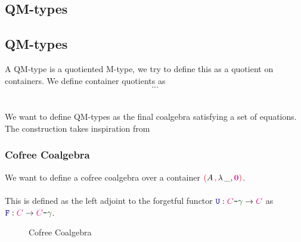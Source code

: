 \documentclass[twoside,11pt,openright]{report}
\theoremstyle{plain} %
\theoremstyle{definition}
\theoremstyle{remark}
\newcommand*{\term}[1]{\textcolor{green!30!black}{#1}} %
\newcommand*{\type}[1]{\textcolor{magenta!90!black}{#1}}
\newcommand*{\containerpair}[2]{\textcolor{red}{(}#1\,\textcolor{red}{,}\,#2\textcolor{red}{)}}
\newcommand*{\universe}[1]{\textcolor{orange!80!black}{#1}}
\newcommand*{\unit}{\type{\textbf{1}}}
\newcommand*{\empt}{\type{\textbf{0}}}
\newcommand*{\coalg}[2]{#1\texttt{-}#2}
\newcommand*{\function}[1]{\textcolor{blue!60!black}{\ensuremath{\mathtt{#1}}}}
\newcommand*{\functor}[1]{\ensuremath{\mathbf{\mathtt{#1}}}}
\begin{document}

\subsection{QM-types}


\subsection{QM-types}
A QM-type is a quotiented M-type, we try to define this as a quotient on containers. We define container quotients as
\begin{equation}
  ...
\end{equation}
\\ \\
We want to define QM-types as the final coalgebra satisfying a set of equations. The construction takes inspiration from \cite{Infinitary-QIITs}
\subsubsection{Cofree Coalgebra}
We want to define a cofree coalgebra over a container \(\containerpair{A}{\lambda\,\_, \empt}\).
\\ \\
This is defined as the left adjoint to the forgetful functor \(\function{U} : \coalg{\type{C}}{\term{\gamma}} \rightarrow \type{C}\) as \(\function{F} : \type{C} \rightarrow \coalg{\type{C}}{\term{\gamma}}\).

\begin{figure}[h]
  \centering
  \caption{Cofree Coalgebra}
  \label{fig:cofree-coalgebra}
\end{figure}
\end{document}
